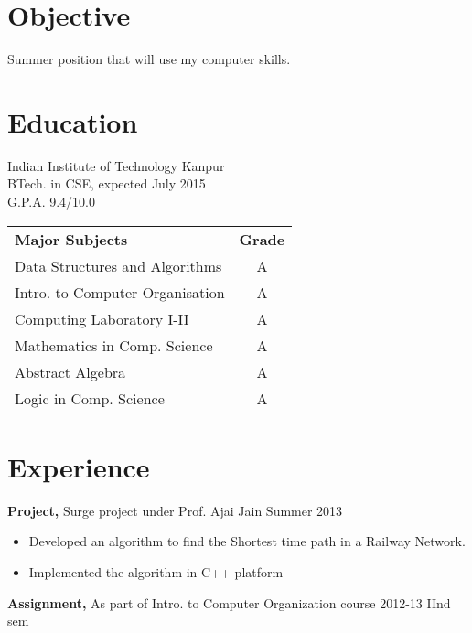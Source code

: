 \documentclass[margin]{res}
\begin{document}
 
\begin{resume} 
 
\section{Objective} 
Summer position that will use my computer skills.

\section{Education} 
Indian Institute of Technology Kanpur\\
                BTech. in CSE, expected July 2015 \\
                G.P.A. 9.4/10.0 
 
                \begin{tabular}{ l c }
               
                {\bf Major Subjects}   &  {\bf Grade} \\
                Data Structures and Algorithms           &  A \\
                Intro. to Computer Organisation &  A \\
                Computing Laboratory I-II        & A \\
                Mathematics in Comp. Science  & A \\
                Abstract Algebra   &  A \\
                Logic in Comp. Science &  A\\
		\end{tabular}

\section{Experience}
{\bf Project,} Surge project under Prof. Ajai Jain \hfill
Summer 2013                
                \begin{itemize} \itemsep -2pt
                 \item Developed an algorithm to find the Shortest time path in a Railway Network.
                
                 \item Implemented the algorithm in C++ platform

		 \end{itemize}

{\bf Assignment,} As part of Intro. to Computer Organization course \hfill 2012-13  IInd sem 


\end{resume}
\end{document}
